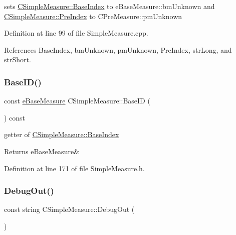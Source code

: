 sets \hyperlink{classCSimpleMeasure_a191dbfa4cc374946bf8a82111f827d92}{C\+Simple\+Measure\+::\+Base\+Index} to e\+Base\+Measure\+::bm\+Unknown and \hyperlink{classCSimpleMeasure_aa23ed9eec21adb9a97c90a424e7ee18a}{C\+Simple\+Measure\+::\+Pre\+Index} to C\+Pre\+Measure\+::pm\+Unknown 



Definition at line 99 of file Simple\+Measure.\+cpp.



References Base\+Index, bm\+Unknown, pm\+Unknown, Pre\+Index, str\+Long, and str\+Short.

\mbox{\label{classCSimpleMeasure_a8b523b4264aed1ccae15fd39cc7e31f4}} 
\subsubsection{\texorpdfstring{Base\+I\+D()}{BaseID()}}
{\footnotesize\ttfamily const \hyperlink{BaseMeasure_8h_ac90e5164ccf1f0d648fba7e94b229a11}{e\+Base\+Measure} C\+Simple\+Measure\+::\+Base\+ID (\begin{DoxyParamCaption}{ }\end{DoxyParamCaption}) const\hspace{0.3cm}{\ttfamily [inline]}}



getter of \hyperlink{classCSimpleMeasure_a191dbfa4cc374946bf8a82111f827d92}{C\+Simple\+Measure\+::\+Base\+Index} 

\begin{DoxyReturn}{Returns}
e\+Base\+Measure\& 
\end{DoxyReturn}


Definition at line 171 of file Simple\+Measure.\+h.

\mbox{\label{classCSimpleMeasure_a1031ddc7887dce1a739f38abe03601da}} 
\subsubsection{\texorpdfstring{Debug\+Out()}{DebugOut()}}
{\footnotesize\ttfamily const string C\+Simple\+Measure\+::\+Debug\+Out (\begin{DoxyParamCaption}{ }\end{DoxyParamCaption})}



